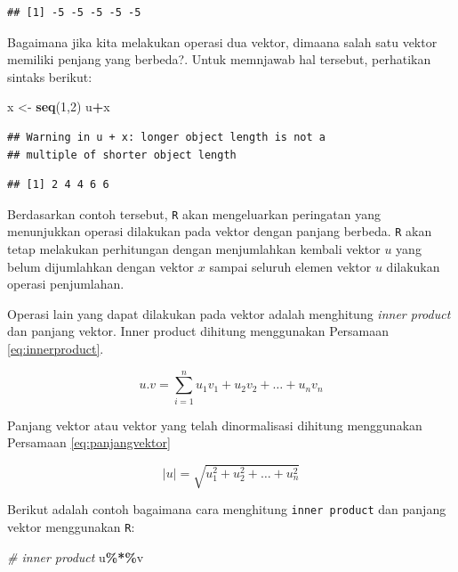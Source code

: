 \documentclass[
]{book}
\newenvironment{Shaded}{\begin{snugshade}}{\end{snugshade}}
\newcommand{\CommentTok}[1]{\textcolor[rgb]{0.56,0.35,0.01}{\textit{#1}}}
\newcommand{\DecValTok}[1]{\textcolor[rgb]{0.00,0.00,0.81}{#1}}
\newcommand{\FunctionTok}[1]{\textcolor[rgb]{0.13,0.29,0.53}{\textbf{#1}}}
\newcommand{\NormalTok}[1]{#1}
\newcommand{\OtherTok}[1]{\textcolor[rgb]{0.56,0.35,0.01}{#1}}
\newcommand{\SpecialCharTok}[1]{\textcolor[rgb]{0.81,0.36,0.00}{\textbf{#1}}}
\theoremstyle{definition}
\theoremstyle{definition}
\theoremstyle{definition}
\theoremstyle{definition}
\theoremstyle{remark}
\begin{document}
\begin{verbatim}
## [1] -5 -5 -5 -5 -5
\end{verbatim}

Bagaimana jika kita melakukan operasi dua vektor, dimaana salah satu vektor memiliki penjang yang berbeda?. Untuk memnjawab hal tersebut, perhatikan sintaks berikut:

\begin{Shaded}
\begin{Highlighting}[]
\NormalTok{x }\OtherTok{\textless{}{-}} \FunctionTok{seq}\NormalTok{(}\DecValTok{1}\NormalTok{,}\DecValTok{2}\NormalTok{)}
\NormalTok{u}\SpecialCharTok{+}\NormalTok{x}
\end{Highlighting}
\end{Shaded}

\begin{verbatim}
## Warning in u + x: longer object length is not a
## multiple of shorter object length
\end{verbatim}

\begin{verbatim}
## [1] 2 4 4 6 6
\end{verbatim}

Berdasarkan contoh tersebut, \texttt{R} akan mengeluarkan peringatan yang menunjukkan operasi dilakukan pada vektor dengan panjang berbeda. \texttt{R} akan tetap melakukan perhitungan dengan menjumlahkan kembali vektor \(u\) yang belum dijumlahkan dengan vektor \(x\) sampai seluruh elemen vektor \(u\) dilakukan operasi penjumlahan.

Operasi lain yang dapat dilakukan pada vektor adalah menghitung \emph{inner product} dan panjang vektor. Inner product dihitung menggunakan Persamaan \eqref{eq:innerproduct}.

\begin{equation}
u.v=\sum_{i=1}^nu_1v_1+u_2v_2+\dots+u_nv_n
  \label{eq:innerproduct}
\end{equation}

Panjang vektor atau vektor yang telah dinormalisasi dihitung menggunakan Persamaan \eqref{eq:panjangvektor}

\begin{equation}
\left|u\right|=\sqrt{u_1^2+u_2^2+\dots+u_n^2}
  \label{eq:panjangvektor}
\end{equation}

Berikut adalah contoh bagaimana cara menghitung \texttt{inner\ product} dan panjang vektor menggunakan \texttt{R}:

\begin{Shaded}
\begin{Highlighting}[]
\CommentTok{\# inner product}
\NormalTok{u}\SpecialCharTok{\%*\%}\NormalTok{v}
\end{Highlighting}
\end{Shaded}
\end{document}
